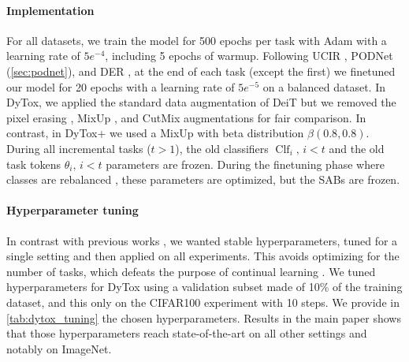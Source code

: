 \paragraph{Implementation} For all datasets, we train the model for 500 epochs per task with Adam
\citep{kingma2014adam} with a learning rate of $5e^{-4}$, including 5 epochs of warmup. Following
UCIR \citep{hou2019ucir}, PODNet (\autoref{sec:podnet}), and DER \citep{yan2021der}, at the end of
each task (except the first) we finetuned our model for 20 epochs with a learning rate of $5e^{-5}$
on a balanced dataset. In DyTox, we applied the standard data augmentation of DeiT
\citep{touvron2021deit} but we removed the pixel erasing \citep{zhong2017erasing}, MixUp
\citep{hingyi2018mixup}, and CutMix \citep{yun2019cutmix} augmentations for fair comparison. In
contrast, in DyTox+ we used a MixUp \citep{hingyi2018mixup} with beta distribution $\beta(0.8,
    0.8)$. During all incremental tasks ($t>1$), the old classifiers $\operatorname{Clf}_i,\, i < t$ and
the old task tokens $\theta_i,\, i < t$ parameters are frozen. During the finetuning phase where
classes are rebalanced \citep{castro2018end_to_end_inc_learn,hou2019ucir,yan2021der}, these
parameters are optimized, but the SABs are frozen.

\paragraph{Hyperparameter tuning} In contrast with previous works \citep{yan2021der}, we wanted
stable hyperparameters, tuned for a single setting and then applied on all experiments. This avoids
optimizing for the number of tasks, which defeats the purpose of continual learning
\citep{farquhar2018robustcontinual}. We tuned hyperparameters for DyTox using a validation subset
made of 10\% of the training dataset, and this only on the CIFAR100 experiment with 10 steps. We
provide in \autoref{tab:dytox_tuning} the chosen hyperparameters. Results in the main paper shows
that those hyperparameters reach state-of-the-art on all other settings and notably on ImageNet.




